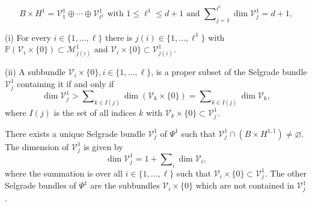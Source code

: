 \documentclass[10pt,a4paper]{amsart}
\begin{document}
	\begin{equation}
		B\times H^{1}=\mathcal{V}_{1}^{1}\oplus\cdots\oplus\mathcal{V}_{\ell^{1}}%
		^{1}\mbox{ with }1\leq\ell^{1}\leq d+1\mbox{ and }\sum\nolimits_{j=1}%
		^{\ell^{1}}\dim\mathcal{V}_{j}^{1}=d+1, \label{Sel_1}%
	\end{equation}

	\begin{lemma}
		\label{Lemma_dim1}(i) For every $i\in\{1,\ldots,\ell\}$ there is
		$j(i)\in\{1,\ldots,\ell^{1}\}$ with $\mathbb{P}\left(  \mathcal{V}_{i}%
		\times\{0\}\right)  \allowbreak\subset\mathcal{M}_{j(i)}^{1}$ and
		$\mathcal{V}_{i}\times\{0\}\subset\mathcal{V}_{j(i)}^{1}$.
		
		(ii) A subbundle $\mathcal{V}_{i}\times\{0\},i\in\{1,\ldots,\ell\}$, is a
		proper subset of the Selgrade bundle $\mathcal{V}_{j}^{1}$ containing it if
		and only if
		\begin{equation}
			\dim\mathcal{V}_{j}^{1}>\sum\nolimits_{k\in I(j)}\dim\left(  \mathcal{V}%
			_{k}\times\{0\}\right)  =\sum\nolimits_{k\in I(j)}\dim\mathcal{V}_{k},
			\label{dim4}%
		\end{equation}
		where $I(j)$ is the set of all indices $k$ with $\mathcal{V}_{k}%
		\times\{0\}\subset\mathcal{V}_{j}^{1}$.
	\end{lemma}

	\begin{lemma}
		\label{Lemma_affine2}There exists a unique Selgrade bundle $\mathcal{V}%
		_{j}^{1}$ of $\Psi^{1}$ such that $\mathcal{V}_{j}^{1}\cap\left(  B\times
		H^{1,1}\right)  \not =\varnothing$. The dimension of $\mathcal{V}_{j}^{1}$ is
		given by
		\begin{equation}
			\dim\mathcal{V}_{j}^{1}=1+\sum\nolimits_{i}\dim\mathcal{V}_{i}, \label{dim0}%
		\end{equation}
		where the summation is over all $i\in\{1,\ldots,\ell\}$ such that
		$\mathcal{V}_{i}\times\{0\}\subset\mathcal{V}_{j}^{1}$. The other Selgrade
		bundles of $\Psi^{1}$ are the subbundles $\mathcal{V}_{i}\times\{0\}$ which
		are not contained in $\mathcal{V}_{j}^{1}$.
	\end{lemma}
\end{document}
